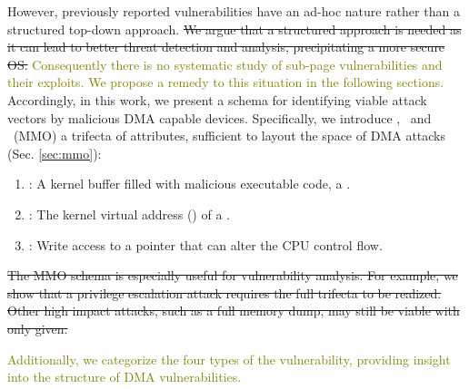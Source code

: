 However, previously reported vulnerabilities have an ad-hoc nature \cite{thunder,MMT16,Ben17b} rather than a structured top-down approach. \st{We argue that a structured approach is needed as it can lead to better threat detection and analysis, precipitating a more secure OS.}
\textcolor{olive}{Consequently there is no systematic study of sub-page vulnerabilities and their exploits. We propose a remedy to this situation in the following sections.}
Accordingly, in this work, we present a schema for identifying viable attack vectors by malicious DMA capable devices. Specifically, we introduce \means,~\motivation{} and \oportunity~(MMO) a trifecta of attributes, sufficient to layout the space of DMA attacks (Sec. \ref{sec:mmo}):
\begin{enumerate}
    \item \motivation: A kernel buffer filled with malicious executable code, a \mabaf.
    \item \means: The kernel virtual address (\kva) of a \mabaf.
    \item \oportunity: Write access to a pointer that can alter the CPU control flow.
\end{enumerate} 

\st{The MMO schema is especially useful for vulnerability analysis. For example, we show that a privilege escalation attack requires the full trifecta to be realized. Other high impact attacks, such as a full memory dump, may still be viable with only \oportunity{} given.}

\textcolor{olive}{Additionally, we categorize the four types of the \subpage{} vulnerability, providing insight into the structure of DMA vulnerabilities.}


